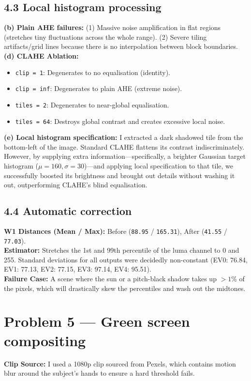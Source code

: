 \documentclass[a4paper,11pt]{article}
\begin{document}
\subsection*{4.3 Local histogram processing}
\textbf{(b) Plain AHE failures:} (1) Massive noise amplification in flat regions (stretches tiny fluctuations across the whole range). (2) Severe tiling artifacts/grid lines because there is no interpolation between block boundaries. \\
\textbf{(d) CLAHE Ablation:}
\begin{itemize}
    \item \texttt{clip = 1}: Degenerates to no equalisation (identity).
    \item \texttt{clip = inf}: Degenerates to plain AHE (extreme noise).
    \item \texttt{tiles = 2}: Degenerates to near-global equalisation.
    \item \texttt{tiles = 64}: Destroys global contrast and creates excessive local noise.
\end{itemize}

\textbf{(e) Local histogram specification:} I extracted a dark shadowed tile from the bottom-left of the image. Standard CLAHE flattens its contrast indiscriminately. However, by supplying extra information---specifically, a brighter Gaussian target histogram ($\mu=160, \sigma=30$)---and applying local specification to that tile, we successfully boosted its brightness and brought out details without washing it out, outperforming CLAHE's blind equalisation.

\subsection*{4.4 Automatic correction}
\textbf{W1 Distances (Mean / Max):} Before (\texttt{88.95} / \texttt{165.31}), After (\texttt{41.55} / \texttt{77.03}). \\
\textbf{Estimator:} Stretches the 1st and 99th percentile of the luma channel to 0 and 255. Standard deviations for all outputs were decidedly non-constant (EV0: 76.84, EV1: 77.13, EV2: 77.15, EV3: 97.14, EV4: 95.51). \\
\textbf{Failure Case:} A scene where the sun or a pitch-black shadow takes up $>1\%$ of the pixels, which will drastically skew the percentiles and wash out the midtones.

\section*{Problem 5 --- Green screen compositing}
\textbf{Clip Source:} I used a 1080p clip sourced from Pexels, which contains motion blur around the subject's hands to ensure a hard threshold fails.
\end{document}
